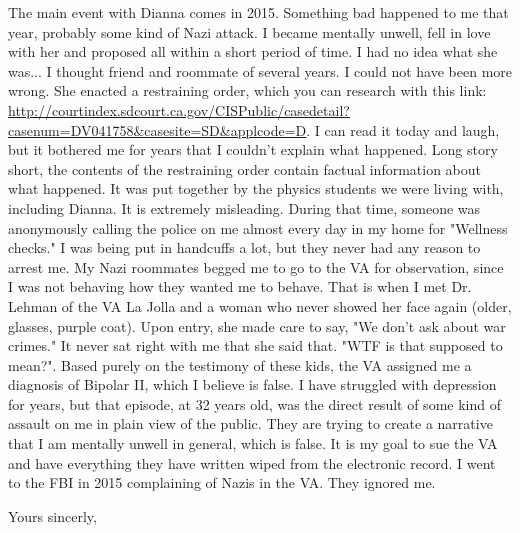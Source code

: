 \documentclass[a4paper]{arthur-letter}
\begin{document}
\begin{letter}
            The main event with Dianna comes in 2015. Something bad happened to me that year, probably some kind of Nazi attack. I became mentally unwell, fell in love with her and proposed all within a short period of time. I had no idea what she was... I thought friend and roommate of several years. I could not have been more wrong. She enacted a restraining order, which you can research with this link: \url{http://courtindex.sdcourt.ca.gov/CISPublic/casedetail?casenum=DV041758&casesite=SD&applcode=D}. I can read it today and laugh, but it bothered me for years that I couldn't explain what happened. Long story short, the contents of the restraining order contain factual information about what happened. It was put together by the physics students we were living with, including Dianna. It is extremely misleading. During that time, someone was anonymously calling the police on me almost every day in my home for "Wellness checks." I was being put in handcuffs a lot, but they never had any reason to arrest me. My Nazi roommates begged me to go to the VA for observation, since I was not behaving how they wanted me to behave. That is when I met Dr. Lehman of the VA La Jolla and a woman who never showed her face again (older, glasses, purple coat). Upon entry, she made care to say, "We don't ask about war crimes." It never sat right with me that she said that. "WTF is that supposed to mean?". Based purely on the testimony of these kids, the VA assigned me a diagnosis of Bipolar II, which I believe is false. I have struggled with depression for years, but that episode, at 32 years old, was the direct result of some kind of assault on me in plain view of the public. They are trying to create a narrative that I am mentally unwell in general, which is false. It is my goal to sue the VA and have everything they have written wiped from the electronic record. I went to the FBI in 2015 complaining of Nazis in the VA. They ignored me. \\
            
            
            

            \closing{Yours sincerly,} %


    \end{letter}
\end{document}
